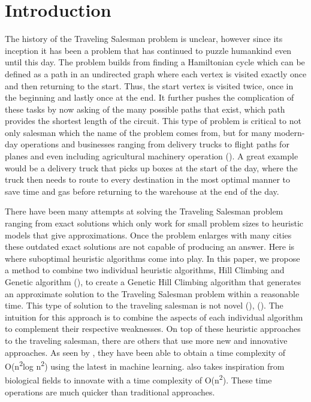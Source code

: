 \documentclass[sigplan,screen]{acmart}
\begin{document}
\maketitle

\section{Introduction}
The history of the Traveling Salesman problem is unclear, however since its
inception it has been a problem that has continued to puzzle humankind even
until this day. The problem builds from finding a Hamiltonian cycle which can be
defined as a path in an undirected graph where each vertex is visited exactly
once and then returning to the start. Thus, the start vertex is visited twice,
once in the beginning and lastly once at the end. It further pushes the
complication of these tasks by now asking of the many possible paths that exist,
which path provides the shortest length of the circuit. This type of problem is
critical to not only salesman which the name of the problem comes from, but for
many modern-day operations and businesses ranging from delivery trucks to flight
paths for planes and even including agricultural machinery operation
(\citet{liao_research_2021}). A great example would be a delivery truck that picks
up boxes at the start of the day, where the truck then needs to route to every
destination in the most optimal manner to save time and gas before returning to
the warehouse at the end of the day.

There have been many attempts at solving the Traveling Salesman problem ranging
from exact solutions which only work for small problem sizes to heuristic
models that give approximations. Once the problem enlarges with many cities
these outdated exact solutions are not capable of producing an answer. Here is
where suboptimal heuristic algorithms come into play. In this paper, we propose
a method to combine two individual heuristic algorithms, Hill Climbing and
Genetic algorithm (\citet{harik_compact_1999}), to create a Genetic Hill Climbing
algorithm that generates an approximate solution to the Traveling Salesman
problem within a reasonable time. This type of solution to the traveling
salesman is not novel (\citet{yuret_2014}), (\citet{wang_hybrid_2011}). The
intuition for this approach is to combine the aspects of each individual
algorithm to complement their respective weaknesses. On top of these heuristic
approaches to the traveling salesman, there are others that use more new and
innovative approaches. As seen by \citet{mele_new_2021}, they have been able to
obtain a time complexity of O(n\textsuperscript{2}log n\textsuperscript{2})
using the latest in machine learning. \citet{ren_parallel_2020} also takes
inspiration from biological fields to innovate with a time complexity of
O(n\textsuperscript{2}). These time operations are much quicker than
traditional approaches.
\end{document}
